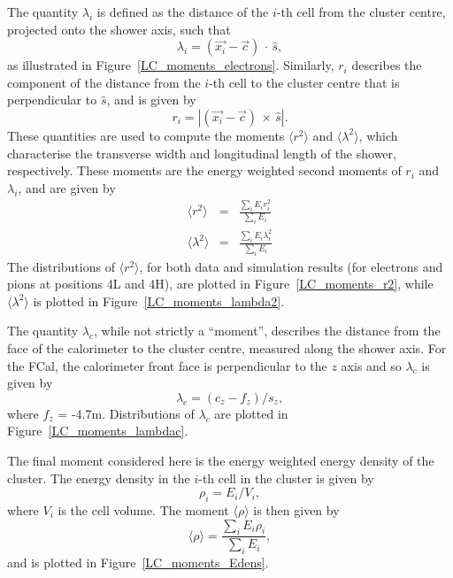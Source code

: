 The quantity $\lambda_i$ is defined as the distance of the $i$-th cell from the cluster centre, projected onto the shower axis, such that
\begin{equation}
\lambda_i = (\vec{x_i} - \vec{c}) \, \cdot \, \hat{s},
\end{equation}
as illustrated in Figure~\ref{LC_moments_electrons}. Similarly, $r_i$ describes the component of the distance from the $i$-th cell to the cluster centre that is perpendicular to $\hat{s}$, and is given by
\begin{equation}
r_i = |(\vec{x_i} - \vec{c}) \, \times \,\hat{s}|.
\end{equation}
These quantities are used to compute the moments $\langle r^2 \rangle$ and $\langle \lambda^2 \rangle$, which characterise the transverse width and longitudinal length of the shower, respectively. These moments are the energy weighted second moments of $r_i$ and $\lambda_i$, and are given by
\begin{eqnarray}
\langle r^2 \rangle & = & \frac{\sum_i E_i r_i^2}{\sum_i E_i}\\
\langle \lambda^2 \rangle & = & \frac{\sum_i E_i \lambda_i^2}{\sum_i E_i}
\end{eqnarray}
The distributions of $\langle r^2 \rangle$, for both data and simulation results (for electrons and pions at positions 4L and 4H), are plotted in Figure~\ref{LC_moments_r2}, while $\langle \lambda^2 \rangle$ is plotted in Figure~\ref{LC_moments_lambda2}.

The quantity $\lambda_c$, while not strictly a ``moment'', describes the distance from the face of the calorimeter to the cluster centre, measured along the shower axis. For the FCal, the calorimeter front face is perpendicular to the $z$ axis and so $\lambda_c$ is given by
\begin{equation}
\lambda_c = (c_z - f_z)/s_z,
\end{equation}
where $f_z$ = -4.7m. Distributions of $\lambda_c$ are plotted in Figure~\ref{LC_moments_lambdac}.

The final moment considered here is the energy weighted energy density of the cluster. The energy density in the $i$-th cell in the cluster is given by
\begin{equation}
\rho_i = E_i/V_i,
\end{equation}
where $V_i$ is the cell volume. The moment $\langle \rho \rangle$ is then given by
\begin{equation}
\langle \rho \rangle = \frac{\sum_i E_i \rho_i}{\sum_i E_i},
\end{equation}
and is plotted in Figure~\ref{LC_moments_Edens}.


